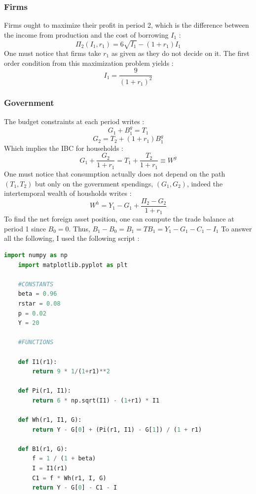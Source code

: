 \documentclass{article}
\begin{document}
\subsubsection*{Firms}
Firms ought to maximize their profit in period 2, which is the difference between the income from production and the cost of borrowing $I_1$ : 
\begin{equation}
    \Pi_2(I_1, r_1)  = 6\sqrt{I_1} - (1+r_1) I_1
\end{equation}
One must notice that firms take $r_1$ as given as they do not decide on it.\newline
The first order condition from this maximization problem yields :
\begin{equation}
    I_1  = \frac{9}{(1+r_1)^2}
\end{equation}
\subsubsection*{Government}
The budget constraints at each period writes :
\begin{equation}
    G_1 + B_1^g = T_1
\end{equation}
\begin{equation}
    G_2  = T_2 + (1+r_1) B_1^g
\end{equation}
Which implies the IBC for households :
\begin{equation}
    G_1 + \frac{G_2}{1+r_1}  = T_1 + \frac{T_2}{1+r_1} \equiv W^g
\end{equation}
One must notice that consumption actually does not depend on the path $(T_1, T_2)$ but only on the government spendings, $(G_1, G_2)$, indeed the intertemporal wealth of housholds writes :
\begin{equation}
    W^h  = Y_1 - G_1 + \frac{\Pi_2 - G_2}{1+r_1}
\end{equation}
To find the net foreign asset position, one can compute the trade balance at period 1 since $B_0 = 0$.\newline
Thus, $B_1 - B_0 = B_1 = TB_1 = Y_1 - G_1 - C_1 - I_1$\newline
To answer all the following, I used the following script :
\begin{lstlisting}[language=Python, label=python_code]
    import numpy as np
    import matplotlib.pyplot as plt
    
    #CONSTANTS
    beta = 0.96
    rstar = 0.08
    p = 0.02
    Y = 20

    #FUNCTIONS

    def I1(r1):
        return 9 * 1/(1+r1)**2

    def Pi(r1, I1):
        return 6 * np.sqrt(I1) - (1+r1) * I1
    
    def Wh(r1, I1, G):
        return Y - G[0] + (Pi(r1, I1) - G[1]) / (1 + r1)
    
    def B1(r1, G):
        f = 1 / (1 + beta)
        I = I1(r1)
        C1 = f * Wh(r1, I, G)
        return Y - G[0] - C1 - I
\end{lstlisting}
\end{document}
